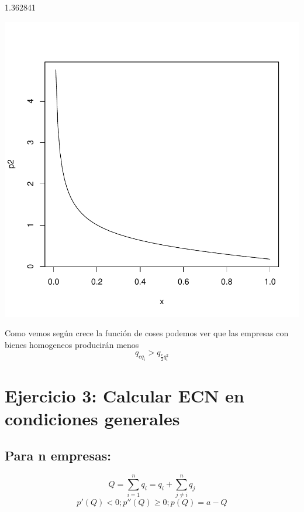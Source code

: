 \documentclass{article}
\begin{document}
\begin{Schunk}
\begin{Soutput}
[1] 1.362841
\end{Soutput}
\end{Schunk}
\includegraphics{PUTAPRUEBA-002}

Como vemos según crece la funci\'on de coses podemos ver que las empresas con bienes homogeneos producir\'an menos 
$$q_{cq_i}>q_{\frac{c}{2}q_i^2}$$

\section{Ejercicio 3: Calcular ECN en condiciones generales} 

\subsection{Para n empresas:}

$$Q=\sum_{i=1}^nq_i=q_i+\sum_{j\neq i}^nq_j$$             
$$p'(Q)<0; p''(Q)\geq0; p(Q)=a-Q$$                                
         
\end{document}
